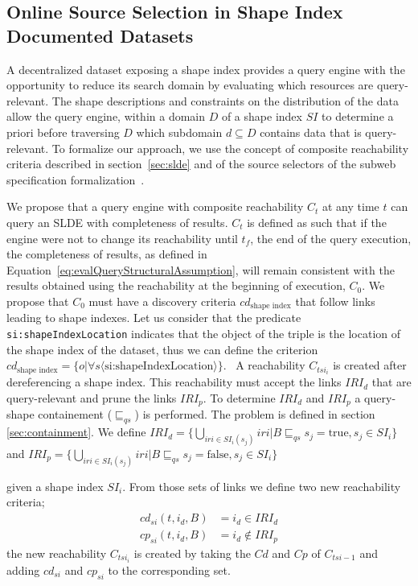 \subsection{Online Source Selection in Shape Index Documented Datasets}

A decentralized dataset exposing a shape index provides a query engine with the opportunity to reduce its search domain by evaluating which resources are query-relevant.
The shape descriptions and constraints on the distribution of the data allow the query engine, 
within a domain $D$ of a shape index $SI$ to determine a priori before traversing $D$ which subdomain $d \subseteq D$ contains data that is query-relevant.
To formalize our approach, we use the concept of composite reachability criteria described in section~\ref{sec:slde} and of the source selectors of the subweb specification formalization~\cite{Bogaerts2021LinkTW, Taelman2023}.

We propose that a query engine with composite reachability $C_t$ at any time $t$ can query an SLDE with completeness of results.
$C_t$ is defined as such that if the engine were not to change its reachability
until $t_f$, the end of the query execution, the completeness of results,
as defined in Equation~\ref{eq:evalQueryStructuralAssumption},
will remain consistent with the results obtained using the reachability at the beginning of execution, $C_{0}$.
We propose that $C_0$ must have a discovery criteria $cd_{\text{shape index}}$ that follow links leading to shape indexes.
Let us consider that the predicate \texttt{si:shapeIndexLocation} indicates that the object of the triple is the location of the shape index 
of the dataset, thus we can define the criterion
$cd_{\text{shape index}} = \{o|\forall s \langle \text{si:shapeIndexLocation} \rangle \}$.~
A reachability $C_{tsi_i}$ is created after dereferencing a shape index.
This reachability must accept the links $IRI_d$ that are query-relevant and prune the links $IRI_p$.
To determine $IRI_d$ and $IRI_p$ a query-shape containement ($\sqsubseteq_{qs}$) is performed.
The problem is defined in section \ref{sec:containment}.
We define 
$IRI_d = \{ \bigcup_{iri \in SI_i(s_j)} iri |  B \sqsubseteq_{qs}  s_j = \mathrm{true}, s_j \in SI_i \}$ and 
$IRI_p = \{ \bigcup_{iri \in SI_i(s_j)} iri | B \sqsubseteq_{qs}  s_j = \mathrm{false}, s_j \in SI_i \}$

given a shape index $SI_i$.
From those sets of links we define two new reachability criteria;
\begin{equation}
   \begin{aligned}
       cd_{si}(t, i_d, B) &= i_d \in IRI_d \\
       cp_{si}(t, i_d, B) &= i_d \notin IRI_p
   \end{aligned}
\end{equation}
the new reachability $C_{tsi_i}$ is created by taking the $Cd$ and $Cp$ of $C_{tsi - 1}$ and adding
$cd_{si}$ and $cp_{si}$ to the corresponding set. 

